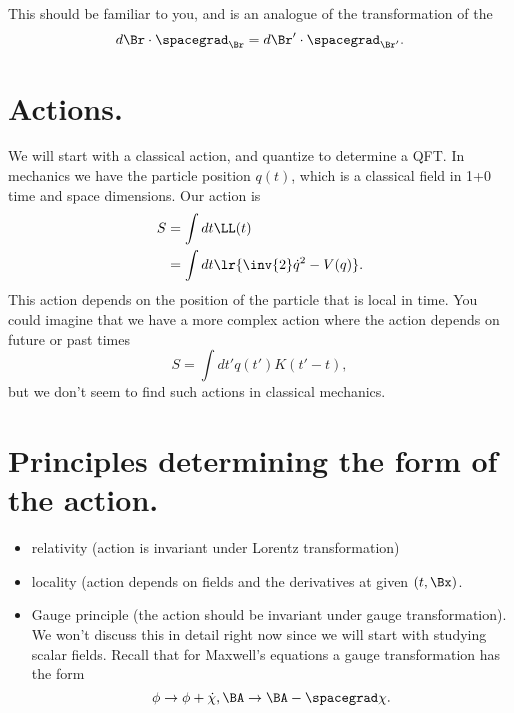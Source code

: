 This should be familiar to you, and is an analogue of the transformation of the
\begin{equation}\label{eqn:qftLecture3:340}
d\Br \cdot \spacegrad_\Br
=
d\Br' \cdot \spacegrad_{\Br'}.
\end{equation}
\section{Actions.}
We will start with a classical action, and quantize to determine a QFT.
In mechanics we have the particle position \( q(t) \), which is a classical field in 1+0 time and space dimensions.  Our action is
\begin{equation}\label{eqn:qftLecture3:360}
\begin{aligned}
S
&= \int dt \LL(t) \\
&= \int dt \lr{
\inv{2} \dot{q}^2 - V(q)
}.
\end{aligned}
\end{equation}
This action depends on the position of the particle that is local in time.
You could imagine that we have a more complex action where the action depends on future or past times
\begin{equation}\label{eqn:qftLecture3:380}
S
= \int dt' q(t') K( t' - t ),
\end{equation}
but we don't seem to find such actions in classical mechanics.

\section{Principles determining the form of the action.}
\begin{itemize}
\item relativity (action is invariant under Lorentz transformation)
\item locality (action depends on fields and the derivatives at given \((t, \Bx)\).
\item Gauge principle (the action should be invariant under gauge transformation).  We won't discuss this in detail right now since we will start with studying scalar fields.
Recall that for Maxwell's equations a gauge transformation has the form
\begin{equation}\label{eqn:qftLecture3:520}
\phi \rightarrow \phi + \dot{\chi}, \BA \rightarrow \BA - \spacegrad \chi.
\end{equation}
\end{itemize}

